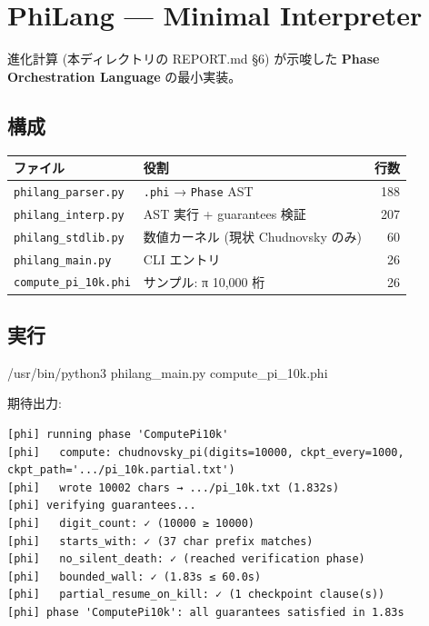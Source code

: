 \documentclass[
]{ltjsarticle}
\author{}
\date{}
\newenvironment{Shaded}{}{}
\newcommand{\ExtensionTok}[1]{#1}
\newcommand{\NormalTok}[1]{#1}
\newcounter{none} %
\begin{document}
{
\setcounter{tocdepth}{2}
\tableofcontents
}
\section{PhiLang --- Minimal
Interpreter}\label{philang-minimal-interpreter}

進化計算 (本ディレクトリの REPORT.md §6) が示唆した \textbf{Phase
Orchestration Language} の最小実装。

\subsection{構成}\label{ux69cbux6210}

{\def\LTcaptype{none} %
\begin{longtable}[]{@{}llr@{}}
\toprule\noalign{}
ファイル & 役割 & 行数 \\
\midrule\noalign{}
\endhead
\bottomrule\noalign{}
\endlastfoot
\texttt{philang\_parser.py} & \texttt{.phi} → \texttt{Phase} AST &
188 \\
\texttt{philang\_interp.py} & AST 実行 + guarantees 検証 & 207 \\
\texttt{philang\_stdlib.py} & 数値カーネル (現状 Chudnovsky のみ) &
60 \\
\texttt{philang\_main.py} & CLI エントリ & 26 \\
\texttt{compute\_pi\_10k.phi} & サンプル: π 10,000 桁 & 26 \\
\end{longtable}
}

\subsection{実行}\label{ux5b9fux884c}

\begin{Shaded}
\begin{Highlighting}[]
\ExtensionTok{/usr/bin/python3}\NormalTok{ philang\_main.py compute\_pi\_10k.phi}
\end{Highlighting}
\end{Shaded}

期待出力:

\begin{verbatim}
[phi] running phase 'ComputePi10k'
[phi]   compute: chudnovsky_pi(digits=10000, ckpt_every=1000, ckpt_path='.../pi_10k.partial.txt')
[phi]   wrote 10002 chars → .../pi_10k.txt (1.832s)
[phi] verifying guarantees...
[phi]   digit_count: ✓ (10000 ≥ 10000)
[phi]   starts_with: ✓ (37 char prefix matches)
[phi]   no_silent_death: ✓ (reached verification phase)
[phi]   bounded_wall: ✓ (1.83s ≤ 60.0s)
[phi]   partial_resume_on_kill: ✓ (1 checkpoint clause(s))
[phi] phase 'ComputePi10k': all guarantees satisfied in 1.83s
\end{verbatim}
\end{document}
